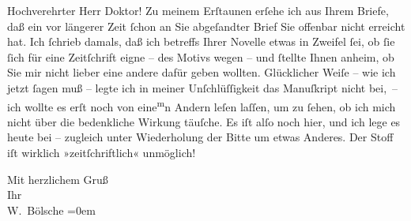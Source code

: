 \pstart\center{}Hochverehrter Herr Doktor!\pend\vspace{0.5em}
\pstart
           Zu meinem Erſtaunen erſehe ich aus Ihrem Briefe, daß ein vor längerer Zeit{ }ſchon an
               Sie abgeſandter Brief Sie offenbar nicht erreicht hat. Ich{ }ſchrieb damals, daß ich
               betreffs Ihrer Novelle etwas
                  \introOben{}in\introOben{} Zweifel{ }ſei, ob{ }ſie{ }ſich für eine Zeitſchrift eigne –
               des Motivs wegen – und{ }ſtellte Ihnen anheim, ob Sie mir nicht lieber eine andere
               dafür geben wollten. Glücklicher Weiſe – wie ich jetzt{ }ſagen muß – legte ich in {\pb}meiner Unſchlüſſigkeit das Manuſkript nicht bei, – ich
               wollte es erſt noch von eine\substVorne{}\textsuperscript{m}\substDazwischen{}n\substHinten{} Andern leſen laſſen, um  zu{ }ſehen, ob ich
               mich nicht über die bedenkliche Wirkung täuſche. Es iſt alſo noch hier, und ich lege
               es heute bei – zugleich unter Wiederholung der Bitte um etwas Anderes. Der Stoff iſt wirklich
               »zeitſchriftlich« unmöglich!\pend
           
\pstart
           Mit herzlichem Gruß{\\[\baselineskip]}Ihr{\\[\baselineskip]}\spacefill\mbox{W. Bölsche}\pend
           \leftskip=0em{}\endnumbering{}  \newcommand{\dateiname}{L00106}\newcommand{\titel}{Wilhelm Bölsche an Arthur Schnitzler, [24. 7. 1892]}\newcommand{\editorInnen}{Martin Anton Müller und Gerd-Hermann Susen}
